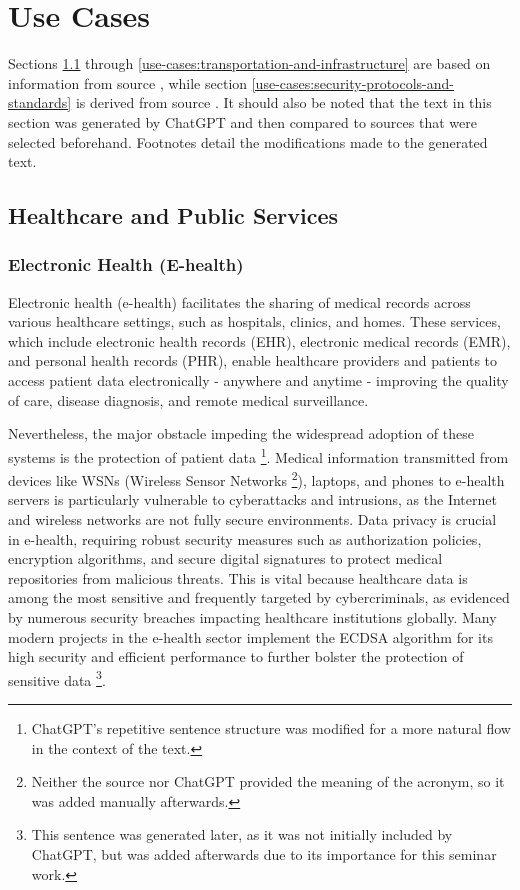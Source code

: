 \section{Use Cases}

Sections \ref{use-cases:health-and-public-services} through \ref{use-cases:transportation-and-infrastructure} are based on information from source \cite{Al-Zubaidie2019}, while section \ref{use-cases:security-protocols-and-standards} is derived from source \cite{Varma2018}. It should also be noted that the text in this section was generated by ChatGPT and then compared to sources that were selected beforehand. Footnotes detail the modifications made to the generated text.

\subsection{Healthcare and Public Services}
\label{use-cases:health-and-public-services}

\subsubsection{Electronic Health (E-health)}

Electronic health (e-health) facilitates the sharing of medical records across various healthcare settings, such as hospitals, clinics, and homes. These services, which include electronic health records (EHR), electronic medical records (EMR), and personal health records (PHR), enable healthcare providers and patients to access patient data electronically - anywhere and anytime - improving the quality of care, disease diagnosis, and remote medical surveillance.

Nevertheless, the major obstacle impeding the widespread adoption of these systems is the protection of patient data \footnote{ChatGPT's repetitive sentence structure was modified for a more natural flow in the context of the text.}. Medical information transmitted from devices like WSNs (Wireless Sensor Networks \footnote{Neither the source nor ChatGPT provided the meaning of the acronym, so it was added manually afterwards.}), laptops, and phones to e-health servers is particularly vulnerable to cyberattacks and intrusions, as the Internet and wireless networks are not fully secure environments. Data privacy is crucial in e-health, requiring robust security measures such as authorization policies, encryption algorithms, and secure digital signatures to protect medical repositories from malicious threats. This is vital because healthcare data is among the most sensitive and frequently targeted by cybercriminals, as evidenced by numerous security breaches impacting healthcare institutions globally. Many modern projects in the e-health sector implement the ECDSA algorithm for its high security and efficient performance to further bolster the protection of sensitive data \footnote{This sentence was generated later, as it was not initially included by ChatGPT, but was added afterwards due to its importance for this seminar work.}.

